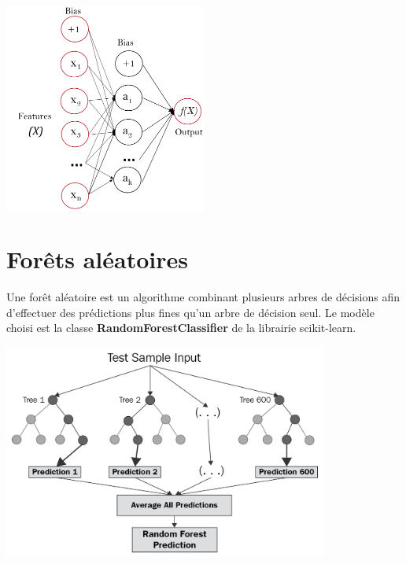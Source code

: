 \begin{center}
\includegraphics[width=0.5\textwidth]{figures/exemple_MLP.png}
\label{fig7}
\end{center}

\section{Forêts aléatoires}

Une forêt aléatoire est un algorithme combinant plusieurs arbres de décisions afin d’effectuer des prédictions plus fines qu’un arbre de décision seul. Le modèle choisi est la classe \textbf{RandomForestClassifier} de la librairie scikit-learn.

\begin{center}
\includegraphics[width=0.8\textwidth]{figures/exemple_RF.png}
\label{fig8}
\end{center}


